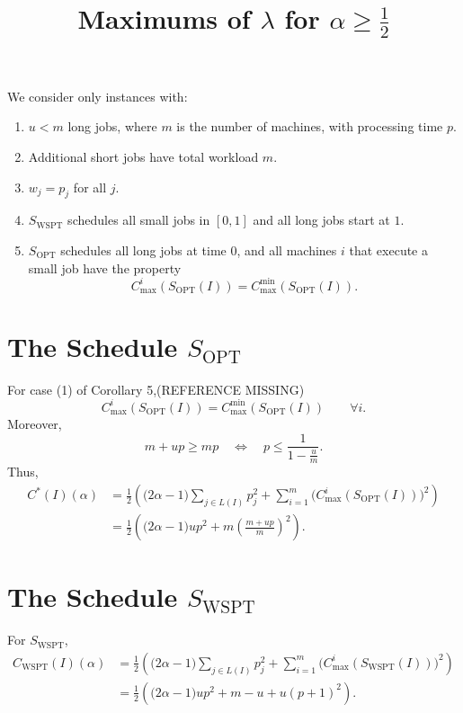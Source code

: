 \documentclass[11pt]{article}
\title{Maximums of $\lambda$ for $\alpha \ge \frac12$}
\author{}
\date{}
\newcommand{\WSPT}{\mathrm{WSPT}}
\newcommand{\OPT}{\mathrm{OPT}}
\begin{document}
\maketitle

We consider only instances with:
\begin{enumerate}[label=(\alph*)]
    \item $u < m$ long jobs, where $m$ is the number of machines, with processing time $p$.
    \item Additional short jobs have total workload $m$.
    \item $w_j = p_j$ for all $j$.
    \item $S_{\WSPT}$ schedules all small jobs in $[0,1]$ and all long jobs start at $1$.
    \item $S_{\OPT}$ schedules all long jobs at time $0$, and all machines $i$ that execute a small job have the property
    \[
        C_{\max}^i(S_{\OPT}(I)) = C_{\max}^{\min}(S_{\OPT}(I)).
    \]
\end{enumerate}

\section*{The Schedule $S_{\OPT}$}

For case (1) of Corollary 5,(REFERENCE MISSING)
\[
    C_{\max}^i(S_{\OPT}(I)) = C_{\max}^{\min}(S_{\OPT}(I))
    \qquad \forall i.
\]
Moreover,
\[
    m + up \ge mp
    \quad\Longleftrightarrow\quad
    p \le \frac{1}{1-\frac{u}{m}}.
\]
Thus,
\begin{align*}
    C^*(I)(\alpha)
    &=
    \frac12 \left(
        \bigl(2\alpha-1\bigr)
        \sum_{j \in L(I)} p_j^2
        +
        \sum_{i=1}^m
        \bigl(C_{\max}^i(S_{\OPT}(I))\bigr)^2
    \right) \\
    &=
    \frac12 \left(
        \bigl(2\alpha-1\bigr)up^2
        +
        m\left(\frac{m+up}{m}\right)^2
    \right).
\end{align*}

\section*{The Schedule $S_{\WSPT}$}

For $S_{\WSPT}$,
\begin{align*}
    C_{\WSPT}(I)(\alpha)
    &=
    \frac12 \left(
        \bigl(2\alpha-1\bigr)
        \sum_{j \in L(I)} p_j^2
        +
        \sum_{i=1}^m
        \bigl(C_{\max}^i(S_{\WSPT}(I))\bigr)^2
    \right) \\
    &=
    \frac12 \left(
        \bigl(2\alpha-1\bigr)up^2
        +
        m-u
        +
        u(p+1)^2
    \right).
\end{align*}
\end{document}
